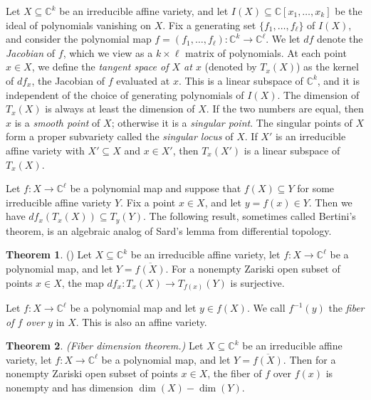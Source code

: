 \documentclass[11pt,a4paper,dvipsnames]{scrartcl}
\theoremstyle{definition}
\newtheorem{theorem}{Theorem}[section]
\newcommand{\CC}{\mathbb{C}}
\begin{document}
Let $X \subseteq \CC^k$ be an irreducible affine variety, and let $I(X) \subseteq \CC[x_1,\ldots,x_k]$ be the ideal of polynomials vanishing on $X$. Fix a generating set $\{f_1,\ldots,f_\ell\}$ of $I(X)$, and consider the polynomial map $f = (f_1,\ldots,f_\ell) : \CC^k \rightarrow \CC^\ell$. We let $df$ denote the \emph{Jacobian} of $f$, which we view as a $k \times \ell$ matrix of polynomials. At each point $x \in X$, we define the \emph{tangent space of $X$ at $x$} (denoted by $T_x(X)$)  as the kernel of $df_x$, the Jacobian of $f$ evaluated at $x$. This is a linear subspace of $\CC^k$, and it is independent of the choice of generating polynomials of $I(X)$. The dimension of $T_x(X)$ is always at least the dimension of $X$. If the two numbers are equal, then $x$ is a \emph{smooth point} of $X$; otherwise it is a \emph{singular point}. The singular points of $X$ form a proper subvariety called the \emph{singular locus} of $X$. If $X'$ is an irreducible affine variety with $X' \subseteq X$ and $x \in X'$, then $T_x(X')$ is a linear subspace of $T_x(X)$. 


Let $f : X \rightarrow \CC^\ell$ be a polynomial map and suppose that $f(X) \subseteq Y$ for some irreducible affine variety $Y$. Fix a point $x \in X$, and let $y = f(x) \in Y$. Then we have $df_x(T_x(X)) \subseteq T_y(Y)$. %
The following result, sometimes called Bertini's theorem, is an algebraic analog of Sard's lemma from differential topology.

\begin{theorem}\label{theorem:bertini} (\cite[Section 6.2]{shafarevich_2013})
    Let $X \subseteq \CC^k$ be an irreducible affine variety, let $f : X \rightarrow \CC^\ell$ be a polynomial map, and let $Y = \overline{f(X)}$. For a nonempty Zariski open subset of points $x \in X$, the map $df_x : T_x(X) \rightarrow T_{f(x)}(Y)$ is surjective. 
\end{theorem}


Let $f: X \rightarrow \CC^\ell$ be a polynomial map and let $y \in f(X)$. We call $f^{-1}(y)$ the  \emph{fiber of $f$ over $y$} in $X$. This is also an affine variety. %

\begin{theorem}\label{theorem:fiberdimension}\cite[Theorem 1.25]{shafarevich_2013} \emph{(Fiber dimension theorem.)}\newline
    Let $X \subseteq \CC^k$ be an irreducible affine variety, let $f : X \rightarrow \CC^\ell$ be a polynomial map, and let $Y = \overline{f(X)}$. Then for a nonempty Zariski open subset of points $x \in X$, the fiber of $f$ over $f(x)$ is nonempty and has dimension $\dim(X) - \dim(Y)$. %
\end{theorem}
\end{document}
